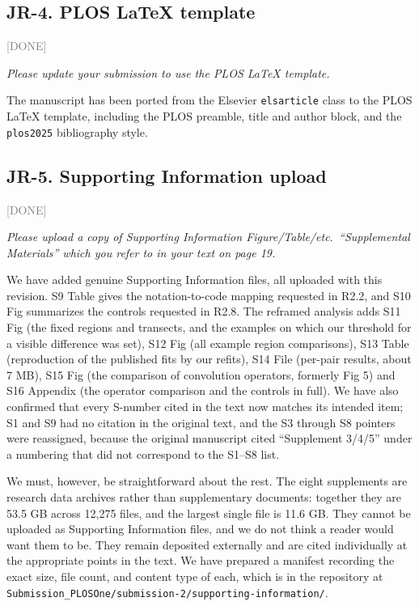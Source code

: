 \documentclass[11pt]{article}
\newcommand{\status}[1]{\textcolor{gray}{\small\textsf{[#1]}}}
\newenvironment{rev}{\begin{leftbar}\itshape\small}{\end{leftbar}}
\begin{document}
\subsection{JR-4. PLOS \LaTeX{} template} \status{DONE}

\begin{rev}
Please update your submission to use the PLOS LaTeX template.
\end{rev}

\noindent The manuscript has been ported from the Elsevier \texttt{elsarticle} class to
the PLOS \LaTeX{} template, including the PLOS preamble, title and author block, and the
\texttt{plos2025} bibliography style.

\subsection{JR-5. Supporting Information upload} \status{DONE}

\begin{rev}
Please upload a copy of Supporting Information Figure/Table/etc.\ ``Supplemental
Materials'' which you refer to in your text on page 19.
\end{rev}

\noindent We have added genuine Supporting Information files, all uploaded with this revision.
S9 Table gives the notation-to-code mapping requested in R2.2, and S10 Fig summarizes the controls
requested in R2.8. The reframed analysis adds S11 Fig (the fixed regions and transects, and the
examples on which our threshold for a visible difference was set), S12 Fig (all example region
comparisons), S13 Table (reproduction of the published fits by our refits), S14 File (per-pair
results, about 7 MB), S15 Fig (the comparison of convolution operators, formerly Fig 5) and S16
Appendix (the operator comparison and the controls in full). We have also confirmed that
every S-number cited in the text now matches its intended item; S1 and S9 had no citation in
the original text, and the S3 through S8 pointers were reassigned, because the original
manuscript cited ``Supplement 3/4/5'' under a numbering that did not correspond to the S1--S8
list.

We must, however, be straightforward about the rest. The eight supplements are research data
archives rather than supplementary documents: together they are 53.5 GB across 12,275 files,
and the largest single file is 11.6 GB. They cannot be uploaded as Supporting Information
files, and we do not think a reader would want them to be. They remain deposited externally
and are cited individually at the appropriate points in the text. We have prepared a manifest
recording the exact size, file count, and content type of each, which is in the repository at
\texttt{Submission\_PLOSOne/submission-2/supporting-information/}.
\end{document}
